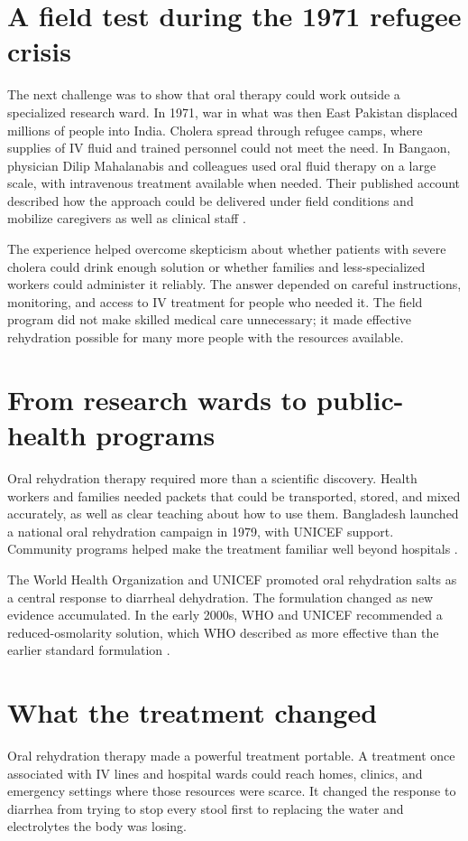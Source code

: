 \documentclass[12pt,oneside]{book}
\begin{document}
\section{A field test during the 1971 refugee crisis}
The next challenge was to show that oral therapy could work outside a
specialized research ward. In 1971, war in what was then East Pakistan
displaced millions of people into India. Cholera spread through refugee
camps, where supplies of IV fluid and trained personnel could not meet the
need. In Bangaon, physician Dilip Mahalanabis and colleagues used oral fluid
therapy on a large scale, with intravenous treatment available when needed.
Their published account described how the approach could be delivered under
field conditions and mobilize caregivers as well as clinical staff
\cite{mahalanabisRefugees}.

The experience helped overcome skepticism about whether patients with severe
cholera could drink enough solution or whether families and less-specialized
workers could administer it reliably. The answer depended on careful
instructions, monitoring, and access to IV treatment for people who needed
it. The field program did not make skilled medical care unnecessary; it made
effective rehydration possible for many more people with the resources
available.

\section{From research wards to public-health programs}
Oral rehydration therapy required more than a scientific discovery. Health
workers and families needed packets that could be transported, stored, and
mixed accurately, as well as clear teaching about how to use them. Bangladesh
launched a national oral rehydration campaign in 1979, with UNICEF support.
Community programs helped make the treatment familiar well beyond hospitals
\cite{unicefBangladesh}.

The World Health Organization and UNICEF promoted oral rehydration salts as a
central response to diarrheal dehydration. The formulation changed as new
evidence accumulated. In the early 2000s, WHO and UNICEF recommended a
reduced-osmolarity solution, which WHO described as more effective than the
earlier standard formulation \cite{whoORS2006}.

\section{What the treatment changed}
Oral rehydration therapy made a powerful treatment portable. A treatment
once associated with IV lines and hospital wards could reach homes, clinics,
and emergency settings where those resources were scarce. It changed the
response to diarrhea from trying to stop every stool first to replacing the
water and electrolytes the body was losing.
\end{document}
